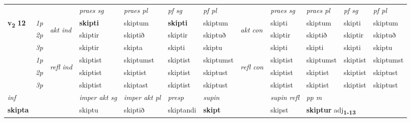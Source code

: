 \begin{longtable}[l]{X>{\footnotesize\itshape}llXXXXlXXXX}
 & &   & \textit{praes sg}  & \textit{praes pl}    & \textit{ pf sg} & \textit{pf pl} & & \textit{praes sg}  & \textit{praes pl}    & \textit{pf sg} & \textit{pf pl }  \\ \cmidrule{4-7} \cmidrule{9-12}
 \multirow{2}{*}{{{\textbf{v{\textsubscript{2}}} \Large{\textbf{12}}}}}  & 1p & \multirow{3}{*}{\begin{turn}{90}\textit{akt ind}\end{turn}} & \textbf{skipti} & skiptum & \textbf{skipti} & skiptum & \multirow{3}{*}{\begin{turn}{90}\textit{akt con}\end{turn}} &skipti & skiptum & skipti & skiptum\\*
 & 2p &  &  skiptir  & skiptið & skiptir & skiptuð & & skiptir & skiptið & skiptir & skiptuð \\*
 & 3p &  & skiptir & skipta & skipti & skiptu & & skipti & skipti& skipti & skiptu \\*
\cmidrule{4-7} \cmidrule{9-12}
 & 1p & \multirow{3}{*}{\begin{turn}{90}\textit{refl ind}\end{turn}}  & skiptist & skiptumst & skiptist & skiptumst & \multirow{3}{*}{\begin{turn}{90}\textit{refl con}\end{turn}}  &skiptist & skiptumst & skiptist & skiptumst \\*
 & 2p &  & skiptist & skiptist & skiptist & skiptust & &skiptist & skiptist & skiptist & skiptust \\*
 & 3p  & & skiptist & skiptast & skiptist & skiptust & & skiptist & skiptist& skiptist & skiptust \\*
\cmidrule{4-7} \cmidrule{9-12}

   {\textit{inf}} & &  & \textit{imper akt sg} & \textit{imper akt pl}   & \textit{presp} & \textit{supin} && \textit{supin refl} & \textit{pp m} \\*
  {\textbf{skipta}} & && skiptu  & skiptið   & skiptandi &  \textbf{skipt} && skipst & \multicolumn{2}{l}{\textbf{skiptur} adj\textbf{\textsubscript{1-13}}} \\*

\midrule


\end{longtable}
